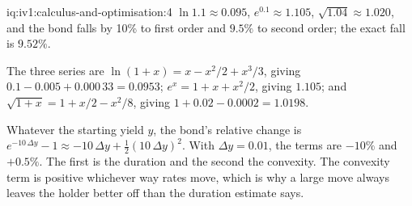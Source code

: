 \begin{solution}{iq:iv1:calculus-and-optimisation:4}
$\ln 1.1 \approx 0.095$, $e^{0.1} \approx 1.105$, $\sqrt{1.04} \approx 1.020$, and the bond falls by 10\% to first order and $9.5\%$ to second order; the exact fall is $9.52\%$.

The three series are $\ln(1 + x) = x - x^2/2 + x^3/3$, giving $0.1 - 0.005 + 0.000\,33 = 0.0953$; $e^x = 1 + x + x^2/2$, giving $1.105$; and $\sqrt{1 + x} = 1 + x/2 - x^2/8$, giving $1 + 0.02 - 0.0002 = 1.0198$.

Whatever the starting yield $y$, the bond's relative change is $e^{-10\,\Delta y} - 1 \approx -10\,\Delta y + \frac12(10\,\Delta y)^2$. With $\Delta y = 0.01$, the terms are $-10\%$ and $+0.5\%$. The first is the duration and the second the convexity. The convexity term is positive whichever way rates move, which is why a large move always leaves the holder better off than the duration estimate says.



\end{solution}


